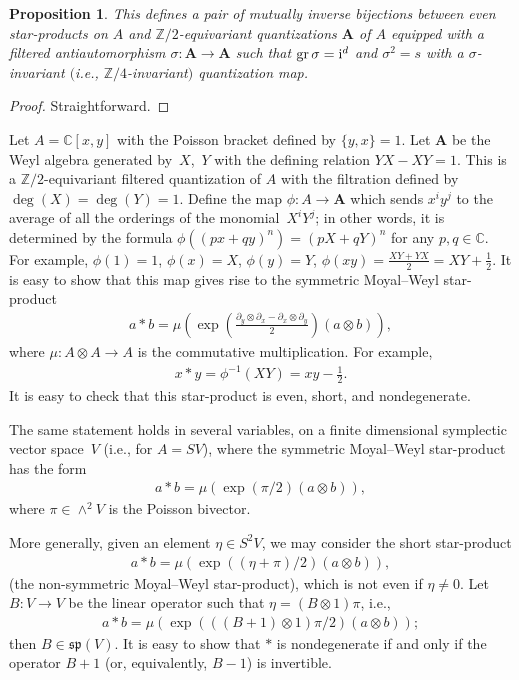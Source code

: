 \documentclass[pdftex]{sigma}
\numberwithin{equation}{section}
\newtheorem{Proposition}[Theorem]{Proposition}
\begin{document}
\begin{Proposition} This defines a pair of mutually inverse bijections between even star-products on $A$ and ${\mathbb Z}/2$-equivariant quantizations ${{\mathbf A}}$ of $A$ equipped with a filtered antiautomorphism $\sigma\colon {{\mathbf A}}\to {{\mathbf A}}$ such that $\operatorname{gr}\sigma={\rm i}^d$ and $\sigma^2=s$ with a $\sigma$-invariant $($i.e., ${\mathbb Z}/4$-invariant$)$ quantization map.
\end{Proposition}

\begin{proof} Straightforward.
\end{proof}

\begin{Example}\label{MV} Let $A={\mathbb C}[x,y]$ with the Poisson bracket defined by $\lbrace y,x\rbrace=1$. Let ${{\mathbf A}}$ be the Weyl algebra generated by~$X$,~$Y$ with the defining relation $YX-XY=1$. This is a ${\mathbb Z}/2$-equivariant filtered quantization of $A$
with the filtration defined by $\deg(X)=\deg(Y)=1$. Define the map $\phi\colon A\to {{\mathbf A}}$ which sends $x^iy^j$ to the average of all the orderings of the monomial~$X^iY^j$; in other words, it is determined by the formula $\phi((px+qy)^n)=(pX+qY)^n$ for any $p,q\in {\mathbb C}$.
For example, $\phi(1)=1$, $\phi(x)=X$, $\phi(y)=Y$, $\phi(xy)=\frac{XY+YX}{2}=XY+\frac{1}{2}$. It is easy to show that this map gives rise to the symmetric Moyal--Weyl star-product
\begin{gather*}
a*b=\mu\left(\exp\left(\frac{\partial_y\otimes \partial_x-\partial_x\otimes \partial_y}{2}\right)(a\otimes b)\right),
\end{gather*}
where $\mu\colon A\otimes A\to A$ is the commutative multiplication. For example,
\begin{gather*}
x*y=\phi^{-1}(XY)=xy-\frac{1}{2}.
\end{gather*}
It is easy to check that this star-product is even, short, and nondegenerate.

The same statement holds in several variables, on a finite dimensional symplectic vector space~$V$ (i.e., for $A=SV$), where the symmetric Moyal--Weyl star-product has the form
\begin{gather*}
a*b=\mu(\exp(\pi/2)(a\otimes b)),
\end{gather*}
where $\pi\in \wedge^2V$ is the Poisson bivector.

More generally, given an element $\eta\in S^2V$, we may consider the short star-product
\begin{gather*}
a*b=\mu(\exp((\eta+\pi)/2)(a\otimes b)),
\end{gather*}
(the non-symmetric Moyal--Weyl star-product), which is not even if $\eta\ne 0$. Let $B\colon V\to V$ be the linear operator such that $\eta=(B\otimes 1)\pi$, i.e.,
\begin{gather}\label{nsmoyal}
a*b=\mu(\exp(((B+1)\otimes 1)\pi/2)(a\otimes b));
\end{gather}
then $B\in \mathfrak{sp}(V)$.
It is easy to show that $*$ is nondegenerate if and only if the operator $B+1$ (or, equivalently, $B-1$) is invertible.
\end{Example}
\end{document}
